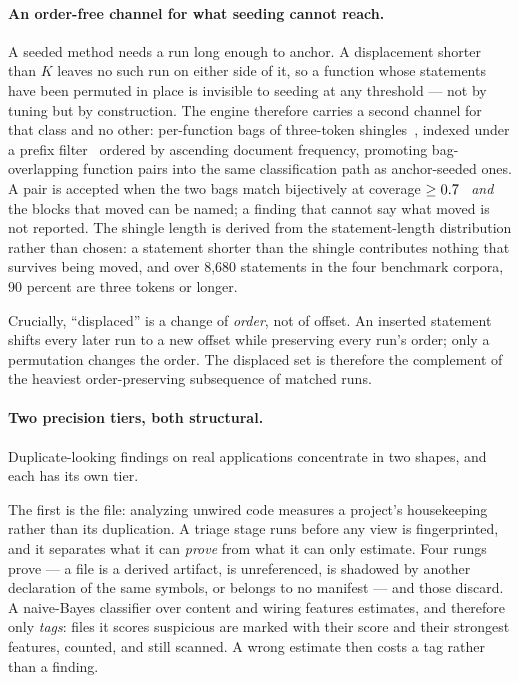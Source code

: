 \documentclass[10pt,a4paper]{article}
\newcounter{lem}[section]
\begin{document}
\paragraph{An order-free channel for what seeding cannot reach.} A seeded method needs a run long
enough to anchor. A displacement shorter than $K$ leaves no such run on either side of it, so a
function whose statements have been permuted in place is invisible to seeding at any threshold ---
not by tuning but by construction. The engine therefore carries a second channel for that class
and no other: per-function bags of three-token shingles~\cite{broder}, indexed under a prefix
filter~\cite{prefixfilter,ppjoin} ordered by ascending document frequency, promoting
bag-overlapping function pairs into the same classification path as anchor-seeded ones. A pair is
accepted when the two bags match bijectively at coverage $\geq 0.7$~\cite{sourcerercc} \emph{and}
the blocks that moved can be named; a finding that cannot say what moved is not reported. The
shingle length is derived from the statement-length distribution rather than chosen: a statement
shorter than the shingle contributes nothing that survives being moved, and over 8,680 statements
in the four benchmark corpora, 90 percent are three tokens or longer.

Crucially, ``displaced'' is a change of \emph{order}, not of offset. An inserted statement shifts
every later run to a new offset while preserving every run's order; only a permutation changes the
order. The displaced set is therefore the complement of the heaviest order-preserving subsequence
of matched runs.

\paragraph{Two precision tiers, both structural.} Duplicate-looking findings on real applications
concentrate in two shapes, and each has its own tier.

The first is the file: analyzing unwired code measures a project's housekeeping rather than its
duplication. A triage stage runs before any view is fingerprinted, and it separates what it can
\emph{prove} from what it can only estimate. Four rungs prove --- a file is a derived artifact, is
unreferenced, is shadowed by another declaration of the same symbols, or belongs to no manifest ---
and those discard. A naive-Bayes classifier over content and wiring features estimates, and
therefore only \emph{tags}: files it scores suspicious are marked with their score and their
strongest features, counted, and still scanned. A wrong estimate then costs a tag rather than a
finding.
\end{document}
